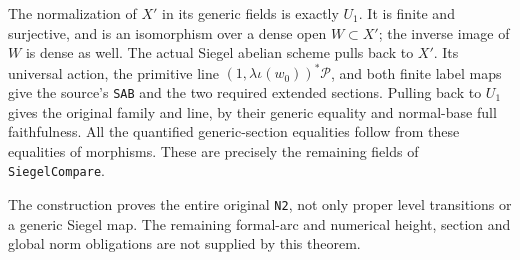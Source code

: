 The normalization of $X'$ in its generic fields is exactly $U_1$.
It is finite and surjective, and is an isomorphism over a dense
open $W\subset X'$; the inverse image of $W$ is dense as well.
The actual Siegel abelian scheme pulls back to $X'$.  Its universal
action, the primitive line $(1,\lambda\iota(w_0))^*\mathcal P$,
and both finite label maps give the source's \texttt{SAB} and
the two required extended sections.  Pulling back to $U_1$ gives
the original family and line, by their generic equality and
normal-base full faithfulness.  All the quantified generic-section
equalities follow from these equalities of morphisms.
These are precisely the remaining fields of \texttt{SiegelCompare}.

The construction proves the entire original \texttt{N2}, not only
proper level transitions or a generic Siegel map.  The remaining
formal-arc and numerical height, section and global norm obligations
are not supplied by this theorem.
